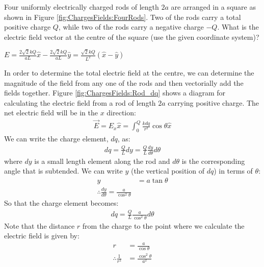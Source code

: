 \question Four uniformly electrically charged rods of length $2a$ are arranged in a square as shown in Figure \ref{fig:ChargesFields:FourRods}. Two of the rods carry a total positive charge $Q$, while two of the rods carry a negative charge $-Q$. What is the electric field vector at the centre of the square (use the given coordinate system)?
\begin{finalanswer}
	$E = \frac{2\sqrt{2}kQ}{aL}\hat x - \frac{2\sqrt{2}kQ}{aL}\hat y=\frac{\sqrt{2}kQ}{L^2}(\hat x - \hat y)$
\end{finalanswer}
\begin{solution}
	In order to determine the total electric field at the centre, we can determine the magnitude of the field from any one of the rods and then vectorially add the fields together. Figure \ref{fig:ChargesFields:Rod_dq} shows a diagram for calculating the electric field from a rod of length $2a$ carrying positive charge.
	The net electric field will be in the $x$ direction:
	\begin{align*}
	\vec E=E_x\hat x=\int_0^Q\frac{kdq}{r^2}\cos\theta \hat x
	\end{align*}
	We can write the charge element, $dq$, as:
	\begin{align*}
	dq=\frac{Q}{L}dy=\frac{Q}{L}\frac{dy}{d\theta}{d\theta}
	\end{align*}
	where $dy$ is a small length element along the rod and $d\theta$ is the corresponding angle that is subtended. We can write $y$ (the vertical position of $dq$) in terms of $\theta$:
	\begin{align*}
	y&=a\tan\theta\\
	\therefore\frac{dy}{d\theta}=\frac{a}{\cos^2\theta}
	\end{align*}
	So that the charge element becomes:
	\begin{align*}
	dq=\frac{Q}{L}\frac{a}{\cos^2\theta}d\theta
	\end{align*}
	Note that the distance $r$ from the charge to the point where we calculate the electric field is given by:
	\begin{align*}
	r&=\frac{a}{\cos\theta}\\
	\therefore\frac{1}{r^2}&=\frac{\cos^2\theta}{a^2}
	\end{align*}

\end{solution}

